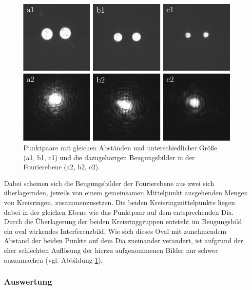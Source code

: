 \begin{figure}[h]
	\centering
	\includegraphics{images/Regina/abb16.pdf}
	\caption[Punktpaare gleicher Abstände und Fourierspektren]{
		Punktpaare mit gleichen Abständen und unterschiedlicher Größe (a1, b1, c1) und die dazugehörigen Beugungsbilder in der Fourierebene (a2, b2, c2).
	}
	\label{fig:punktpaare_gleich_und_spektren}
\end{figure}

Dabei scheinen sich die Beugungsbilder der Fourierebene aus zwei sich überlagernden, jeweils von einem gemeinsamen Mittelpunkt ausgehenden Mengen von Kreisringen, zusammenzusetzen. Die beiden Kreisringmittelpunkte liegen dabei in der gleichen Ebene wie das Punktpaar auf dem entsprechenden Dia. Durch die Überlagerung der beiden Kreisringgruppen entsteht im Beugungsbild ein oval wirkendes Interferenzbild. Wie sich dieses Oval mit zunehmendem Abstand der beiden Punkte auf dem Dia zueinander verändert, ist aufgrund der eher schlechten Auflösung der hierzu aufgenommenen Bilder nur schwer auszumachen (vgl. Abbildung \ref{fig:punktpaare_gleich_und_spektren}). 


\subsubsection*{Auswertung}

